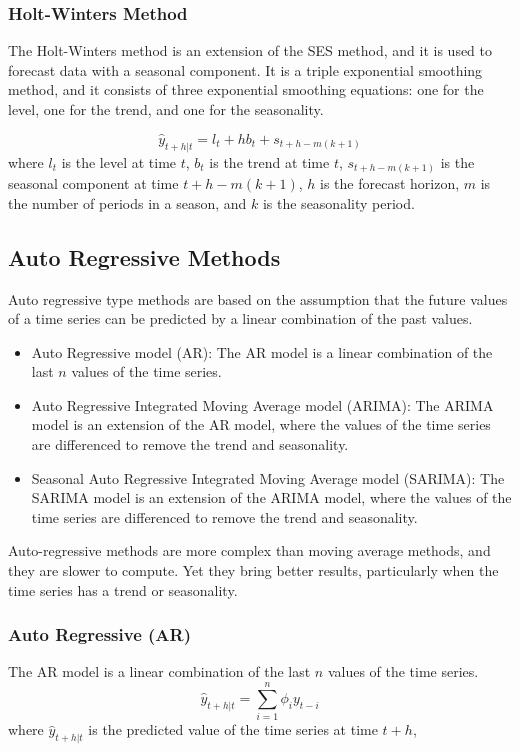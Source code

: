 \documentclass[manuscript,screen,nonacm]{acmart}
\numberwithin{equation}{section}
\begin{document}
\subsubsection{Holt-Winters Method}
The Holt-Winters method is an extension of the SES method, and it is used to forecast
data with a seasonal component. It is a triple exponential smoothing method, and it
consists of three exponential smoothing equations: one for the level, one for the trend,
and one for the seasonality.

\begin{equation}
\label{eq:hw}
\hat{y}_{t+h|t} = l_t + hb_t + s_{t+h-m(k+1)}
\end{equation}
where $l_t$ is the level at time $t$, $b_t$ is the trend at time $t$, $s_{t+h-m(k+1)}$ is the seasonal component at time $t+h-m(k+1)$, $h$ is the forecast horizon, $m$ is the number of periods in a season, and $k$ is the seasonality period.




\subsection{Auto Regressive Methods}
Auto regressive type methods are based on the assumption that the future values of a time series can be predicted by a linear combination of the past values.

\begin{itemize}
	\item Auto Regressive model (AR): The AR model is a linear combination of the last $n$ values of the time series.
	\item Auto Regressive Integrated Moving Average model (ARIMA): The ARIMA model is an extension of the AR model, where the values of the time series are differenced to remove the trend and seasonality.
	\item Seasonal Auto Regressive Integrated Moving Average model (SARIMA): The SARIMA model is an extension of the ARIMA model, where the values of the time series are differenced to remove the trend and seasonality.
\end{itemize}

Auto-regressive methods are more complex than moving average methods, and they are slower to compute. Yet they bring better results, particularly when the time series has a trend or seasonality.


\subsubsection{Auto Regressive (AR)}
The AR model is a linear combination of the last $n$ values of the time series.
\begin{equation}
\label{eq:ar}
\hat{y}_{t+h|t} = \sum_{i=1}^n \phi_i y_{t-i}
\end{equation}
where $\hat{y}_{t+h|t}$ is the predicted value of the time series at time $t+h$,
\end{document}
